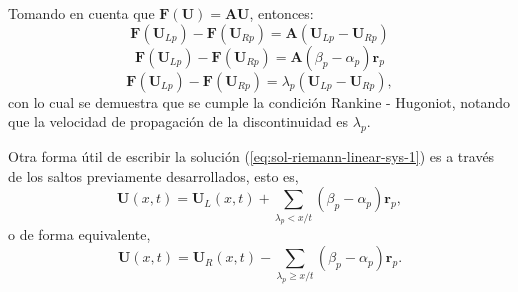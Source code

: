 Tomando en cuenta que $\mathbf{F}(\mathbf{U}) = \mathbf{A}\mathbf{U}$, entonces:
\begin{equation}
 	\mathbf{F}(\mathbf{U}_{Lp}) - \mathbf{F}(\mathbf{U}_{Rp}) = \mathbf{A}(\mathbf{U}_{Lp} - \mathbf{U}_{Rp})
\end{equation}
\begin{equation}
	\mathbf{F}(\mathbf{U}_{Lp}) - \mathbf{F}(\mathbf{U}_{Rp}) = \mathbf{A}(\beta_{p} - \alpha_{p})\mathbf{r}_p
\end{equation}
\begin{equation}
	\mathbf{F}(\mathbf{U}_{Lp}) - \mathbf{F}(\mathbf{U}_{Rp}) = \lambda_{p}(\mathbf{U}_{Lp} - \mathbf{U}_{Rp}),
\end{equation}
con lo cual se demuestra que se cumple la condición Rankine - Hugoniot, notando que la velocidad de propagación de la discontinuidad es $\lambda_p$.

Otra forma útil de escribir la solución (\ref{eq:sol-riemann-linear-sys-1}) es a través de los saltos previamente desarrollados, esto es,
\begin{equation}
	\mathbf{U}(x,t) = \mathbf{U}_{L}(x,t) + \sum_{\lambda_{p} < x/t} (\beta_{p} - \alpha_{p}) \mathbf{r}_{p},
	\label{eq:sol-riemann-linear-1}
\end{equation}
o de forma equivalente,
\begin{equation}
	\mathbf{U}(x,t) = \mathbf{U}_{R}(x,t) - \sum_{\lambda_{p} \geq x/t} (\beta_{p} - \alpha_{p}) \mathbf{r}_{p}.
	\label{eq:sol-riemann-linear-2}
\end{equation}